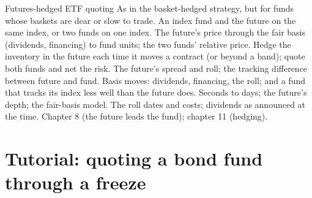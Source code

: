 \begin{strategyfile}{Futures-hedged ETF quoting}\label{strat:hf:etf-market-making:futures}
 As in the basket-hedged strategy, but for funds whose baskets are dear or slow to trade.
 An index fund and the future on the same index, or two funds on one index.
 The future's price through the fair basis (dividends, financing) to fund units; the two funds' relative price.
 Hedge the inventory in the future each time it moves a contract (or beyond a band); quote both funds and net the risk.
 The future's spread and roll; the tracking difference between future and fund.
 Basis moves: dividends, financing, the roll; and a fund that tracks its index less well than the future does.
 Seconds to days; the future's depth; the fair-basis model.
 The roll dates and costs; dividends as announced at the time.
 Chapter 8 (the future leads the fund); chapter 11 (hedging).
\end{strategyfile}

\section{Tutorial: quoting a bond fund through a freeze}\label{tut:hf:etf-market-making:tut}

